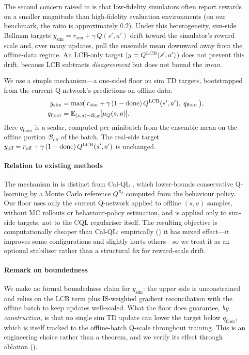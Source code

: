 The second concern raised in  is that low-fidelity simulators often report rewards on a smaller magnitude than high-fidelity evaluation environments (on our benchmark, the ratio is approximately $0.2$).
Under this heterogeneity, sim-side Bellman targets $y_{\text{sim}} = r_{\text{sim}} + \gamma\,Q(s', a')$ drift toward the simulator's reward scale and, over many updates, pull the ensemble mean downward away from the offline-data regime.
An LCB-only target ($y = Q^{\mathrm{LCB}}(s', a')$) does not prevent this drift, because LCB subtracts \emph{disagreement} but does not bound the \emph{mean}.

We use a simple mechanism---a one-sided floor on sim TD targets, bootstrapped from the current Q-network's predictions on offline data:
\begin{equation}
\begin{aligned}
y_{\text{sim}} &= \max\!\bigl(\,r_{\text{sim}} + \gamma\,(1 - \text{done})\,Q^{\mathrm{LCB}}(s', a'),\;q_{\text{floor}}\,\bigr), \\
q_{\text{floor}} &= \mathbb{E}_{(s,a) \sim \mathcal{B}_{\text{off}}}[\mu_Q(s, a)].
\end{aligned}
\label{eq:qfloor}
\end{equation}
Here $q_{\text{floor}}$ is a scalar, computed per minibatch from the ensemble mean on the offline portion $\mathcal{B}_{\text{off}}$ of the batch.
The real-side target $y_{\text{off}} = r_{\text{off}} + \gamma\,(1 - \text{done})\,Q^{\mathrm{LCB}}(s', a')$ is unchanged.

\paragraph{Relation to existing methods}
The mechanism in  is distinct from Cal-QL \citep{nakamoto2023calql}, which lower-bounds conservative Q-learning by a Monte Carlo reference $Q^{\pi_\beta}$ computed from the behaviour policy.
Our floor uses only the current Q-network applied to offline $(s, a)$ samples, without MC rollouts or behaviour-policy estimation, and is applied only to sim-side targets, not to the CQL regulariser itself.
The resulting objective is computationally cheaper than Cal-QL; empirically () it has mixed effect---it improves some configurations and slightly hurts others---so we treat it as an optional stabiliser rather than a structural fix for reward-scale drift.

\paragraph{Remark on boundedness}
We make no formal boundedness claim for $y_{\text{sim}}$: the upper side is unconstrained and relies on the LCB term plus IS-weighted gradient reconciliation with the offline batch to keep updates well-scaled.
What the floor does guarantee, \emph{by construction}, is that no single sim TD update can lower the target below $q_{\text{floor}}$, which is itself tracked to the offline-batch Q-scale throughout training.
This is an engineering choice rather than a theorem, and we verify its effect through ablation ().

